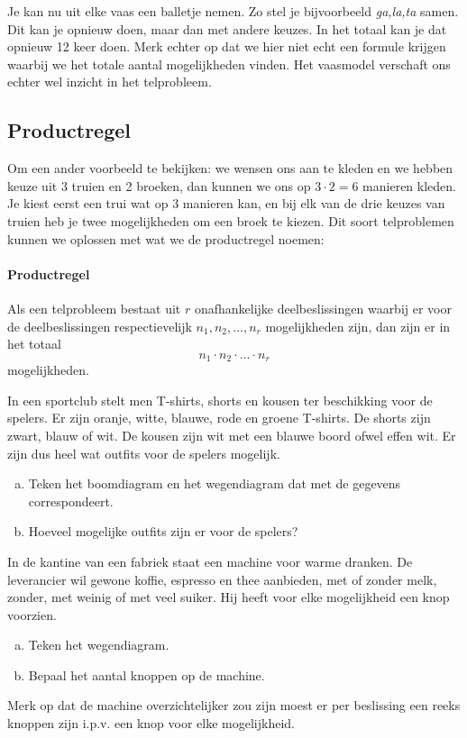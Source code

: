 \documentclass[12pt,a4paper,twoside]{article}
\begin{document}
Je kan nu uit elke vaas een balletje nemen. Zo stel je bijvoorbeeld {\em ga,la,ta} samen. Dit kan je opnieuw doen, maar dan met andere keuzes. In het totaal kan je dat opnieuw 12 keer doen. Merk echter op dat we hier niet echt een formule krijgen waarbij we het totale aantal mogelijkheden vinden. Het vaasmodel verschaft ons echter wel inzicht in het telprobleem.

\subsection{Productregel}

Om een ander voorbeeld te bekijken: we wensen ons aan te kleden en we hebben keuze uit 3 truien en 2 broeken, dan kunnen we ons op $3 \cdot 2 = 6$ manieren kleden. Je kiest eerst een trui wat op 3 manieren kan, en bij elk van de drie keuzes van truien heb je twee mogelijkheden om een broek te kiezen. Dit soort telproblemen kunnen we oplossen met wat we de productregel noemen:

\paragraph*{Productregel}
\begin{mdframed}
Als een telprobleem bestaat uit $r$ onafhankelijke deelbeslissingen waarbij er voor de deelbeslissingen respectievelijk $n_1, n_2, \ldots , n_r$ mogelijkheden zijn, dan zijn er in het totaal
\[n_1 \cdot n_2 \cdot \ldots \cdot n_r\]
mogelijkheden.
\end{mdframed}

\begin{oefening}
In een sportclub stelt men T-shirts, shorts en kousen ter beschikking voor de spelers. Er zijn oranje, witte, blauwe, rode en groene T-shirts. De shorts zijn zwart, blauw of wit. De kousen zijn wit met een blauwe boord ofwel effen wit. Er zijn dus heel wat outfits voor de spelers mogelijk.

\begin{enumerate}[(a)]
\item Teken het boomdiagram en het wegendiagram dat met de gegevens correspondeert.
\item Hoeveel mogelijke outfits zijn er voor de spelers?
\end{enumerate}
\end{oefening}

\begin{oefening}
In de kantine van een fabriek staat een machine voor warme dranken. De leverancier wil gewone koffie, espresso en thee aanbieden, met of zonder melk, zonder, met weinig of met veel suiker. Hij heeft voor elke mogelijkheid een knop voorzien.
\begin{enumerate}[(a)]
\item Teken het wegendiagram.
\item Bepaal het aantal knoppen op de machine.
\end{enumerate}
Merk op dat de machine overzichtelijker zou zijn moest er per beslissing een reeks knoppen zijn i.p.v. een knop voor elke mogelijkheid.
\end{oefening}
\end{document}
